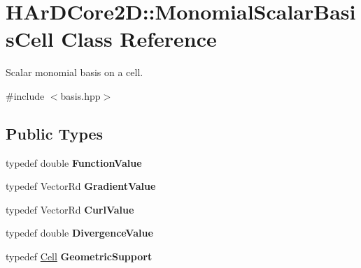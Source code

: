 \hypertarget{classHArDCore2D_1_1MonomialScalarBasisCell}{}\section{H\+Ar\+D\+Core2D\+:\+:Monomial\+Scalar\+Basis\+Cell Class Reference}
\label{classHArDCore2D_1_1MonomialScalarBasisCell}


Scalar monomial basis on a cell.  




{\ttfamily \#include $<$basis.\+hpp$>$}

\subsection*{Public Types}
\begin{DoxyCompactItemize}
\item 
\mbox{\label{classHArDCore2D_1_1MonomialScalarBasisCell_a9a3ca323e3bd9968a90e8e3f9a3a6863}} 
typedef double {\bfseries Function\+Value}
\item 
\mbox{\label{classHArDCore2D_1_1MonomialScalarBasisCell_ad052f1f44cea110341eb1f86c2b732a9}} 
typedef Vector\+Rd {\bfseries Gradient\+Value}
\item 
\mbox{\label{classHArDCore2D_1_1MonomialScalarBasisCell_affa9f1b9379558ebef24a3a0d99ef3fd}} 
typedef Vector\+Rd {\bfseries Curl\+Value}
\item 
\mbox{\label{classHArDCore2D_1_1MonomialScalarBasisCell_a1b25ab56ff038e78ea0f27fb1b1082f2}} 
typedef double {\bfseries Divergence\+Value}
\item 
\mbox{\label{classHArDCore2D_1_1MonomialScalarBasisCell_a524ce4487f4f5163950b88a63d8e4025}} 
typedef \hyperlink{classHArDCore2D_1_1Cell}{Cell} {\bfseries Geometric\+Support}
\end{DoxyCompactItemize}
